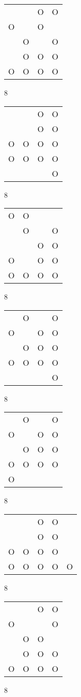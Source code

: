 \begin{tabular}{|m{0.2cm}m{0.2cm}m{0.2cm}m{0.2cm}|}\hline
 & &O&O\\
O& &O& \\
 &O& &O\\
 &O&O&O\\
O&O&O&O\\
\hline\end{tabular}8
\begin{tabular}{|m{0.2cm}m{0.2cm}m{0.2cm}m{0.2cm}|}\hline
 & &O&O\\
 & &O&O\\
O&O&O&O\\
O&O&O&O\\
 & & &O\\
\hline\end{tabular}8
\begin{tabular}{|m{0.2cm}m{0.2cm}m{0.2cm}m{0.2cm}|}\hline
O&O& & \\
 &O& &O\\
 & &O&O\\
O& &O&O\\
O&O&O&O\\
\hline\end{tabular}8
\begin{tabular}{|m{0.2cm}m{0.2cm}m{0.2cm}m{0.2cm}|}\hline
 &O& &O\\
O& &O&O\\
 &O&O&O\\
O&O&O&O\\
 & & &O\\
\hline\end{tabular}8
\begin{tabular}{|m{0.2cm}m{0.2cm}m{0.2cm}m{0.2cm}|}\hline
 &O& &O\\
O& &O&O\\
 &O&O&O\\
O&O&O&O\\
O& & & \\
\hline\end{tabular}8
\begin{tabular}{|m{0.2cm}m{0.2cm}m{0.2cm}m{0.2cm}m{0.2cm}|}\hline
 & &O&O& \\
 & &O&O& \\
O&O&O&O& \\
O&O&O&O&O\\
\hline\end{tabular}8
\begin{tabular}{|m{0.2cm}m{0.2cm}m{0.2cm}m{0.2cm}|}\hline
 & &O&O\\
O& & &O\\
 &O&O& \\
 &O&O&O\\
O&O&O&O\\
\hline\end{tabular}8
